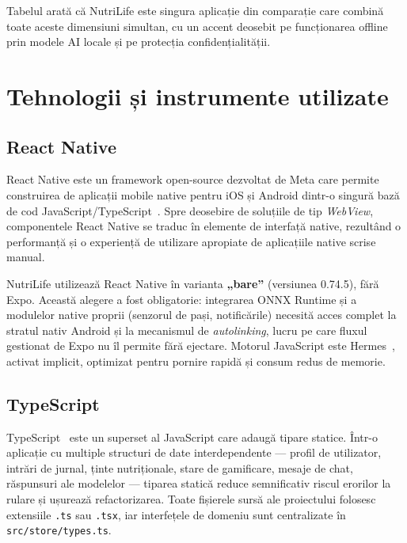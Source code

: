 \documentclass[12pt, a4paper, twoside]{report}
\numberwithin{equation}{section}
\begin{document}
Tabelul arată că NutriLife este singura aplicație din comparație care combină toate aceste
dimensiuni simultan, cu un accent deosebit pe funcționarea offline prin modele AI locale și
pe protecția confidențialității.

\chapter{Tehnologii și instrumente utilizate}

\section{React Native}

React Native este un framework open-source dezvoltat de Meta care permite construirea de
aplicații mobile native pentru iOS și Android dintr-o singură bază de cod
JavaScript/TypeScript~\cite{reactnative}. Spre deosebire de soluțiile de tip \textit{WebView}, componentele
React Native se traduc în elemente de interfață native, rezultând o performanță și o
experiență de utilizare apropiate de aplicațiile native scrise manual.

NutriLife utilizează React Native în varianta \textbf{„bare''} (versiunea 0.74.5), fără
Expo. Această alegere a fost obligatorie: integrarea ONNX Runtime și a modulelor native
proprii (senzorul de pași, notificările) necesită acces complet la stratul nativ Android și
la mecanismul de \textit{autolinking}, lucru pe care fluxul gestionat de Expo nu îl permite
fără ejectare. Motorul JavaScript este Hermes~\cite{hermes}, activat implicit, optimizat pentru pornire
rapidă și consum redus de memorie.

\section{TypeScript}

TypeScript~\cite{typescript} este un superset al JavaScript care adaugă tipare statice. Într-o aplicație cu
multiple structuri de date interdependente --- profil de utilizator, intrări de jurnal,
ținte nutriționale, stare de gamificare, mesaje de chat, răspunsuri ale modelelor ---
tiparea statică reduce semnificativ riscul erorilor la rulare și ușurează refactorizarea.
Toate fișierele sursă ale proiectului folosesc extensiile \texttt{.ts} sau \texttt{.tsx},
iar interfețele de domeniu sunt centralizate în \texttt{src/\allowbreak store/\allowbreak types.ts}.
\end{document}
